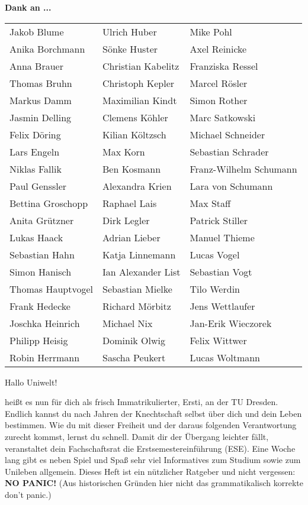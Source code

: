 \textbf{Dank an ...}
\\

\begin{tabular}{l l l} 

Jakob Blume & Ulrich Huber & Mike Pohl\\
Anika Borchmann & Sönke Huster & Axel Reinicke\\
Anna Brauer & Christian Kabelitz & Franziska Ressel\\
Thomas Bruhn & Christoph Kepler& Marcel Rösler\\
Markus Damm & Maximilian Kindt & Simon Rother\\
Jasmin Delling & Clemens Köhler & Marc Satkowski\\
Felix Döring & Kilian Költzsch & Michael Schneider\\
Lars Engeln & Max Korn & Sebastian Schrader\\
Niklas Fallik & Ben Kosmann & Franz-Wilhelm Schumann\\
Paul Genssler & Alexandra Krien & Lara von Schumann\\
Bettina Groschopp & Raphael Lais & Max Staff\\
Anita Grützner & Dirk Legler & Patrick Stiller\\
Lukas Haack & Adrian Lieber & Manuel Thieme\\
Sebastian Hahn & Katja Linnemann & Lucas Vogel\\
Simon Hanisch & Ian Alexander List & Sebastian Vogt\\
Thomas Hauptvogel & Sebastian Mielke & Tilo Werdin\\
Frank Hedecke & Richard Mörbitz & Jens Wettlaufer\\
Joschka Heinrich & Michael Nix & Jan-Erik Wieczorek\\
Philipp Heisig & Dominik Olwig & Felix Wittwer\\
Robin Herrmann & Sascha Peukert & Lucas Woltmann\\

\end{tabular}


Hallo Uniwelt!

heißt es nun für dich als frisch Immatrikulierter, Ersti, an der TU Dresden. 
Endlich kannst du nach Jahren der Knechtschaft selbst über dich und dein Leben bestimmen. 
Wie du mit dieser Freiheit und der daraus folgenden Verantwortung zurecht kommst, lernst du schnell. 
Damit dir der Übergang leichter fällt, veranstaltet dein Fachschaftsrat die Erstsemestereinführung (ESE). 
Eine Woche lang gibt es neben Spiel und Spaß sehr viel Informatives zum Studium sowie zum Unileben allgemein. 
Dieses Heft ist ein nützlicher Ratgeber und nicht vergessen: 
\textbf{NO PANIC!} (Aus historischen Gründen hier nicht das grammatikalisch korrekte \glqq don't panic\grqq.)

